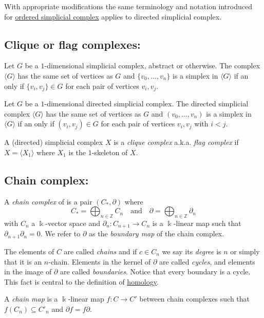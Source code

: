 \documentclass{amsart}
\begin{document}
	With appropriate modifications the same terminology and notation introduced for \hyperref[ordered simplicial complex]{ordered simplicial complex} applies to directed simplicial complex.
	
	\subsection*{Clique or flag complexes:} \label{clique or flag complexes}
	
	Let $G$ be a $1$-dimensional simplicial complex, abstract or otherwise. The complex $\langle G \rangle$ has the same set of vertices as $G$ and $\{v_0, \dots, v_n\}$ is a simplex in $\langle G \rangle$ if an only if $\{v_i, v_j\} \in G$ for each pair of vertices $v_i, v_j$. 
	
	Let $G$ be a $1$-dimensional directed simplicial complex. The directed simplicial complex $\langle G \rangle$ has the same set of vertices as $G$ and $(v_0, \dots, v_n)$ is a simplex in $\langle G \rangle$ if an only if $(v_i, v_j) \in G$ for each pair of vertices $v_i, v_j$ with $i < j$. 
	
	A (directed) simplicial complex $X$ is a \textit{clique complex} a.k.a. \textit{flag complex} if $X = \langle X_1 \rangle$ where $X_1$ is the $1$-skeleton of $X$. 
	
	\subsection*{Chain complex:} \label{chain complex}
	
	A \textit{chain complex} of is a pair $(C_*, \partial)$ where
	\begin{equation*}
	C_* = \bigoplus_{n \in \mathbb Z} C_n \quad \mathrm{and} \quad \partial = \bigoplus_{n \in \mathbb Z} \partial_n
	\end{equation*}
	with $C_n$ a $\Bbbk$-vector space and $\partial_n : C_{n+1} \to C_n$ is a $\Bbbk$-linear map such that $\partial_{n+1} \partial_n = 0$. We refer to $\partial$ as the \textit{boundary map} of the chain complex.
	
	The elements of $C$ are called \textit{chains} and if $c \in C_n$ we say its \textit{degree} is $n$ or simply that it is an $n$-chain. Elements in the kernel of $\partial$ are called \textit{cycles}, and elements in the image of $\partial$ are called \textit{boundaries}. Notice that every boundary is a cycle. This fact is central to the definition of \hyperref[homology]{homology}.
	
	A \textit{chain map} is a $\Bbbk$-linear map $f : C \to C'$ between chain complexes such that $f(C_n) \subseteq C'_n$ and $\partial f = f \partial$.
	
\end{document}
